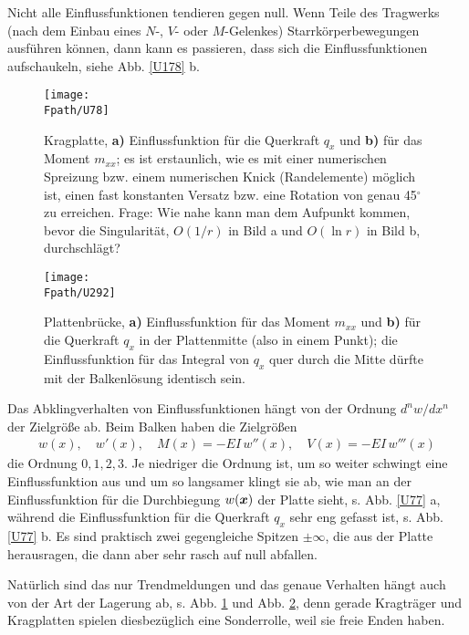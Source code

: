 \begin{remark}
Nicht alle Einflussfunktionen tendieren gegen null. Wenn Teile des Tragwerks (nach dem Einbau eines $N$-, $V$- oder $M$-Gelenkes) Starrk\"{o}rperbewegungen ausf\"{u}hren k\"{o}nnen, dann kann es passieren, dass sich die Einflussfunktionen aufschaukeln, siehe Abb. \ref{U178} b.
\end{remark}
\begin{figure}[tbp]
\centering
\texttt{[image: \\Fpath/U78]}
\caption{Kragplatte, \textbf{ a)} Einflussfunktion f\"{u}r die Querkraft $q_x$ und \textbf{ b)} f\"{u}r das Moment $m_{xx}$; es ist erstaunlich, wie es mit einer \glq numerischen\grq{} Spreizung bzw. einem \glq numerischen\grq{} Knick (Randelemente) m\"{o}glich ist, einen fast konstanten Versatz bzw. eine Rotation von genau 45$^\circ$ zu erreichen. Frage: Wie nahe kann man dem Aufpunkt kommen, bevor die Singularit\"{a}t, $O(1/r)$ in Bild a und $O(\ln r)$ in Bild b, durchschl\"{a}gt?   }
\label{U78}%
\end{figure}%

\begin{figure}[tbp]
\centering
\texttt{[image: \\Fpath/U292]}
\caption{Plattenbr\"{u}cke, \textbf{ a)} Einflussfunktion f\"{u}r das Moment $m_{xx}$ und \textbf{ b)} f\"{u}r die Querkraft $q_{x}$ in der Plattenmitte (also in einem Punkt); die Einflussfunktion f\"{u}r das Integral von $q_x$ quer durch die Mitte d\"{u}rfte mit der Balkenl\"{o}sung identisch sein.}
\label{U292}%
\end{figure}%
\begin{remark}
Das Abklingverhalten von Einflussfunktionen h\"{a}ngt von der Ordnung $d^n w/dx^n$ der Zielgr\"{o}{\ss}e ab. Beim Balken haben die Zielgr\"{o}{\ss}en
\begin{align}
w(x), \quad w'(x), \quad M(x) = - EI\,w''(x), \quad V(x) = - EI\,w'''(x)
\end{align}
die Ordnung $0, 1, 2, 3$. Je niedriger die Ordnung ist, um so weiter schwingt eine Einflussfunktion aus und um so langsamer klingt sie ab, wie man an der Einflussfunktion f\"{u}r die Durchbiegung $w(\mbox{\boldmath $x$})$ der Platte sieht, s. Abb. \ref{U77} a, w\"{a}hrend die Einflussfunktion f\"{u}r die Querkraft $q_x$ sehr eng gefasst ist, s. Abb. \ref{U77} b. Es sind praktisch zwei gegengleiche Spitzen $\pm \infty$, die aus der Platte herausragen, die dann aber sehr rasch auf null abfallen.

Nat\"{u}rlich sind das nur \glq Trendmeldungen\grq{} und das genaue Verhalten h\"{a}ngt auch von der Art der Lagerung ab, s. Abb. \ref{U78} und Abb. \ref{U292}, denn gerade Kragtr\"{a}ger und Kragplatten spielen diesbez\"{u}glich eine Sonderrolle, weil sie freie Enden haben.
\end{remark}

